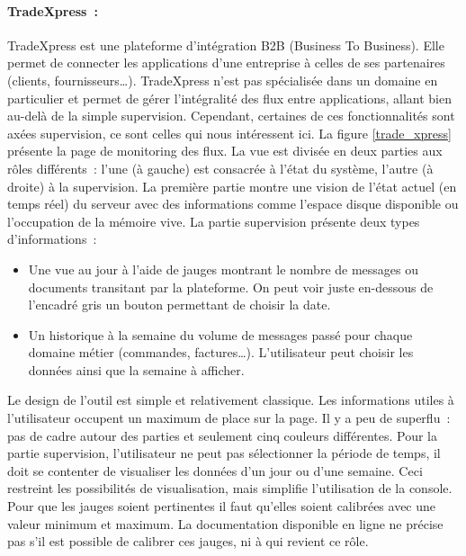 			\paragraph{TradeXpress~:}
			TradeXpress est une plateforme d’intégration B2B (Business To Business).
			Elle permet de connecter les applications d’une entreprise à celles de ses
			partenaires (clients, fournisseurs…). TradeXpress n’est pas spécialisée dans
			un domaine en particulier et permet de gérer l’intégralité des flux entre
			applications, allant bien au-delà de la simple supervision. Cependant, certaines
			de ces fonctionnalités sont axées supervision, ce sont celles qui nous
			intéressent ici. La figure \ref{trade_xpress} présente la page de monitoring des
			flux.\newline
			La vue est divisée en deux parties aux rôles
			différents~: l'une (à gauche) est consacrée à l’état du système, l'autre (à
			droite) à la supervision. La première partie montre une vision de l’état
			actuel (en temps réel) du serveur avec des informations comme l'espace
			disque disponible ou l'occupation de la mémoire vive.
			La partie supervision présente deux types d'informations~:
			\begin{itemize}
			  \item Une vue au jour à l’aide de jauges montrant le nombre de messages ou
			  documents transitant par la plateforme. On peut voir juste en-dessous de
			  l’encadré gris un bouton permettant de choisir la date.
			  \item Un historique à la semaine du volume de messages passé pour chaque
			  domaine métier (commandes, factures\ldots). L’utilisateur peut choisir les
			  données ainsi que la semaine à afficher.
			\end{itemize}
			Le design de l’outil est simple et relativement classique. Les informations
			utiles à l’utilisateur occupent un maximum de place sur la page. Il y a peu
			de superflu~: pas de cadre autour des parties et seulement cinq couleurs différentes.\newline
			Pour la partie supervision, l’utilisateur ne peut pas sélectionner la
			période de temps, il doit se contenter de visualiser les données d’un jour
			ou d’une semaine. Ceci restreint les possibilités de
			visualisation, mais simplifie l’utilisation de la console.\newline
			Pour que les jauges soient pertinentes il faut qu’elles soient calibrées avec
			une valeur minimum et maximum. La documentation disponible en ligne ne précise
			pas s’il est possible de calibrer ces jauges, ni à qui revient ce rôle.

